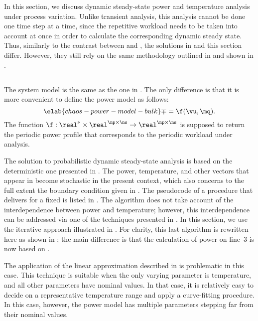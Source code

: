In this section, we discuss dynamic steady-state power and temperature analysis
under process variation. Unlike transient analysis, this analysis cannot be done
one time step at a time, since the repetitive workload needs to be taken into
account at once in order to calculate the corresponding dynamic steady state.
Thus, similarly to the contrast between  and
, the solutions in 
and this section differ. However, they still rely on the same methodology
outlined in  and shown in
.

\subsection{\problemtitle}

The system model is the same as the one in . The
only difference is that it is more convenient to define the power model as
follows:
\begin{equation} \elab{chaos-power-model-bulk}
  \mp = \f(\vu, \mq).
\end{equation}
The function $\f: \real^\nu \times \real^{\np \times \ns} \to \real^{\np \times
\ns}$ is supposed to return the periodic power profile that corresponds to the
periodic workload under analysis.

The solution to probabilistic dynamic steady-state analysis is based on the
deterministic one presented in . The power,
temperature, and other vectors that appear in 
become stochastic in the present context, which also concerns to the full extent
the boundary condition given in . The pseudocode
of a procedure that delivers \mq for a fixed \vu is listed in
. The algorithm does not take account of the
interdependence between power and temperature; however, this interdependence can
be addressed via one of the techniques presented in . In
this section, we use the iterative approach illustrated in
. For clarity, this last algorithm
is rewritten here as shown in ;
the main difference is that the calculation of power on line~3 is now based on
.

\begin{remark}
The application of the linear approximation described in
 is problematic in this case. This technique is suitable
when the only varying parameter is temperature, and all other parameters have
nominal values. In that case, it is relatively easy to decide on a
representative temperature range and apply a curve-fitting procedure. In this
case, however, the power model has multiple parameters stepping far from their
nominal values.
\end{remark}

